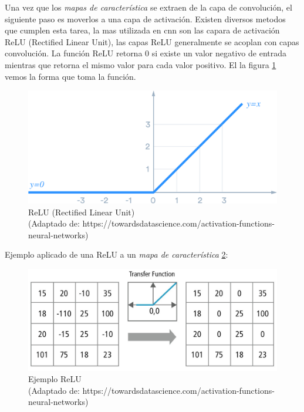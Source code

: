 Una vez que los \textit{mapas de característica} se extraen de la capa de convolución, el siguiente paso es moverlos a una capa de activación. Existen diversos metodos que cumplen esta tarea, la mas utilizada en  \ac{cnn} son las capara de activación ReLU (Rectified Linear Unit), las capas ReLU generalmente se acoplan con capas convolución. La función ReLU retorna 0 si existe un valor negativo de entrada mientras que retorna el mismo valor para cada valor positivo. El la figura  \ref{Fig:relu} vemos la forma que toma la función.

\begin{figure}[H]
 \centering
  \includegraphics[scale=0.2,keepaspectratio=true,clip=true]{imagenes/MarcoTeorico/ReLU_1.png}
  \caption{ReLU (Rectified Linear Unit) \\ (Adaptado de: https://towardsdatascience.com/activation-functions-neural-networks)} \label{Fig:relu}
\end{figure}

Ejemplo aplicado de una ReLU a un \textit{mapa de característica} \ref{Fig:relu2}:
\begin{figure}[H]
 \centering
  \includegraphics[scale=0.2,keepaspectratio=true,clip=true]{imagenes/MarcoTeorico/ReLU_2.jpeg}
  \caption{Ejemplo ReLU  \\(Adaptado de: https://towardsdatascience.com/activation-functions-neural-networks)} \label{Fig:relu2}
\end{figure}

